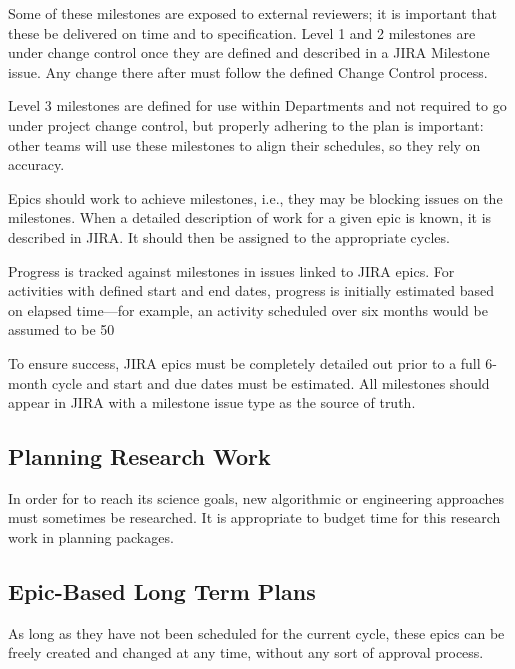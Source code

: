 Some of these milestones are exposed to external reviewers; it is important that these be delivered on time and to specification.
Level 1 and 2 milestones are under change control once they are defined and described in a \gls{JIRA} Milestone issue. Any change there after must follow the defined Change Control process.

Level 3 milestones are defined for use within Departments and not required to go under project change control, but properly adhering to the plan is important: other teams will use these milestones to align their schedules, so they rely on accuracy.

Epics should work to achieve milestones, i.e., they may be blocking issues on the milestones.
When a detailed description of work for a given \gls{epic} is known, it is described in \gls{JIRA}.
It should then be assigned to the appropriate \glspl{cycle}.

Progress is tracked against milestones in issues linked to \gls{JIRA} epics. For activities with defined start and end dates, progress is initially estimated based on elapsed time—for example, an activity scheduled over six months would be assumed to be 50%

To ensure success, \gls{JIRA} epics must be completely detailed out prior to a full 6-month \gls{cycle} and start and due dates must be estimated.
All milestones should appear in \gls{JIRA} with a milestone issue type as the source of truth.

\subsection{Planning Research Work}
\label{sec:long-term-research}

In order for \RO  to reach its science goals, new algorithmic or engineering approaches must sometimes be researched.
It is appropriate to budget time for this research work in planning packages.

\subsection{Epic-Based Long Term Plans}

As long as they have not been scheduled for the current \gls{cycle}, these \glspl{epic} can be freely created and changed at any time, without any sort of approval process.

